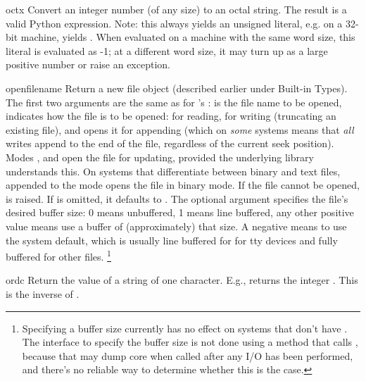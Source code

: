 \begin{funcdesc}{oct}{x}
  Convert an integer number (of any size) to an octal string.  The
  result is a valid Python expression.  Note: this always yields
  an unsigned literal, e.g. on a 32-bit machine,  yields
  .  When evaluated on a machine with the same
  word size, this literal is evaluated as -1; at a different word
  size, it may turn up as a large positive number or raise an
   exception.
\end{funcdesc}

\begin{funcdesc}{open}{filename}
  Return a new file object (described earlier under Built-in Types).
  The first two arguments are the same as for 's
  :  is the file name to be opened,
   indicates how the file is to be opened:  for
  reading,  for writing (truncating an existing file), and
   opens it for appending (which on \emph{some} \UNIX{}
  systems means that \emph{all} writes append to the end of the file,
  regardless of the current seek position).
  Modes ,  and
   open the file for updating, provided the underlying
   library understands this.  On systems that differentiate
  between binary and text files,  appended to the mode opens
  the file in binary mode.  If the file cannot be opened, 
  is raised.
If  is omitted, it defaults to .
The optional  argument specifies the file's desired
buffer size: 0 means unbuffered, 1 means line buffered, any other
positive value means use a buffer of (approximately) that size.  A
negative  means to use the system default, which is
usually line buffered for for tty devices and fully buffered for other
files.%
\footnote{Specifying a buffer size currently has no effect on systems
that don't have .  The interface to specify the buffer
size is not done using a method that calls , because
that may dump core when called after any I/O has been performed, and
there's no reliable way to determine whether this is the case.}
\end{funcdesc}

\begin{funcdesc}{ord}{c}
  Return the \ASCII{} value of a string of one character.  E.g.,
   returns the integer .  This is the inverse of
  .
\end{funcdesc}

